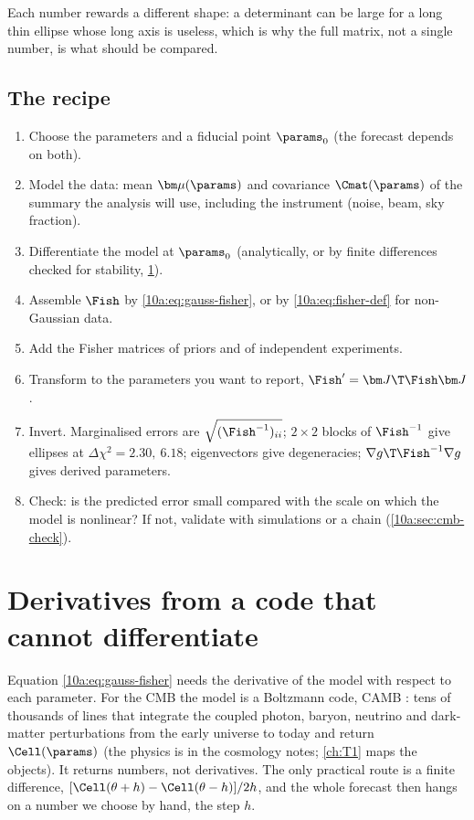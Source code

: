 Each number rewards a different shape: a determinant can be large for a long thin ellipse whose long axis is
useless, which is why the full matrix, not a single number, is what should be compared.

\subsection{The recipe}
\label{10a:sec:recipe}

\begin{workdef}
\begin{enumerate}
  \item Choose the parameters and a fiducial point $\params_0$ (the forecast depends on both).
  \item Model the data: mean $\bm\mu(\params)$ and covariance $\Cmat(\params)$ of the summary the analysis will use,
        including the instrument (noise, beam, sky fraction).
  \item Differentiate the model at $\params_0$ (analytically, or by finite differences checked for stability,
        \cref{10a:sec:numderiv}).
  \item Assemble $\Fish$ by \eqref{10a:eq:gauss-fisher}, or by \eqref{10a:eq:fisher-def} for non-Gaussian data.
  \item Add the Fisher matrices of priors and of independent experiments.
  \item Transform to the parameters you want to report, $\Fish'=\bm J\T\Fish\bm J$.
  \item Invert. Marginalised errors are $\sqrt{(\Fish^{-1})_{ii}}$; $2\times2$ blocks of $\Fish^{-1}$ give ellipses at
        $\Delta\chi^2=2.30,\ 6.18$; eigenvectors give degeneracies; $\nabla g\T\Fish^{-1}\nabla g$ gives derived parameters.
  \item Check: is the predicted error small compared with the scale on which the model is nonlinear? If not,
        validate with simulations or a chain (\cref{10a:sec:cmb-check}).
\end{enumerate}
\end{workdef}
\section{Derivatives from a code that cannot differentiate}
\label{10a:sec:numderiv}

Equation \eqref{10a:eq:gauss-fisher} needs the derivative of the model with respect to each parameter. For the
CMB the model is a Boltzmann code, CAMB \cite{CAMB2000}: tens of thousands of lines that integrate the coupled
photon, baryon, neutrino and dark-matter perturbations from the early universe to today and return
$\Cell(\params)$ (the physics is in the cosmology notes; \cref{ch:T1} maps the objects). It returns numbers, not
derivatives. The only practical route is a finite difference, $[\Cell(\theta+h)-\Cell(\theta-h)]/2h$, and the
whole forecast then hangs on a number we choose by hand, the step $h$.


